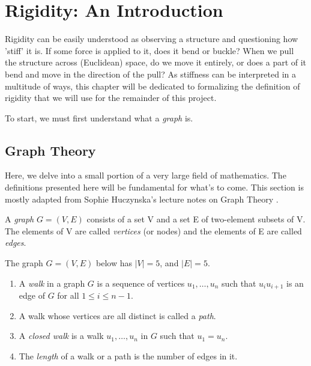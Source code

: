 \chapter{Rigidity: An Introduction} 

\begin{flushleft}
Rigidity can be easily understood as observing a structure and questioning how 'stiff' it is. If some force is applied to it, does it bend or buckle? When we pull the structure across (Euclidean) space, do we move it entirely, or does a part of it bend and move in the direction of the pull? As stiffness can be interpreted in a multitude of ways, this chapter will be dedicated to formalizing the definition of rigidity that we will use for the remainder of this project. 
\end{flushleft}

\begin{flushleft}
To start, we must first understand what a \textit{graph} is.
\end{flushleft}

\section{Graph Theory}

\begin{flushleft}
Here, we delve into a small portion of a very large field of mathematics. The definitions presented here will be fundamental for what's to come. This section is mostly adapted from Sophie Huczynska's lecture notes on Graph Theory \cite{graph_theory}.
\end{flushleft}

\begin{definition}
A \textit{graph} $G = (V,E)$ consists of a set V and a set E of two-element subsets of V. The elements of V are called \textit{vertices} (or nodes) and the elements of E are called \textit{edges}.
\end{definition}

\begin{example}
The graph $G = (V,E)$ below has $|V| = 5$, and $|E| = 5$.
\label{eg: cycle}
\begin{figure}[ht]
    \centering
    
\end{figure}
\end{example}

\begin{definition} 
\begin{enumerate}
    \item A \textit{walk} in a graph $G$ is a sequence of vertices $u_1, \hdots, u_n$ such that $u_iu_{i+1}$ is an edge of $G$ for all $1 \leq i \leq n-1$.
    \item A walk whose vertices are all distinct is called a \textit{path}.
    \item A \textit{closed walk} is a walk $u_1, \hdots, u_n$ in $G$ such that $u_1 = u_n$.
    \item The \textit{length} of a walk or a path is the number of edges in it.
\end{enumerate}
\end{definition}

